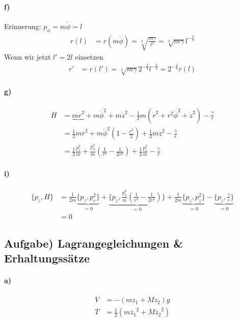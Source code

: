 \documentclass[oneside]{book}
\theoremstyle{definition}
\begin{document}
\paragraph{f)}
Erinnerung: $p_\phi = m \dot{\phi} = l$
\begin{align*}
	r(l) &= r(m \dot\phi) = \sqrt[3]{\frac{m \gamma}{l^2}} = \sqrt[3]{m \gamma} l^{-\frac23}
\end{align*}
Wenn wir jetzt $l' = 2 l$ einsetzen
\begin{align*}
	r' &= r(l') = \sqrt[3]{m \gamma} 2^{-\frac23}l^{-\frac23} = 2^{-\frac23} r(l)
\end{align*}

\paragraph{g)}
\begin{align*}
	H &= \underbrace{m \dot{r}^2} + m \dot{\phi}^2 + m \dot{z}^2 - \frac12 m (\dot{r}^2 + r^2 \dot{\phi}^2 + \dot{z}^2) - \frac{\gamma}{r}\\
	&= \frac12 m \dot{r}^2 + m \dot{\phi}^2 (1 - \frac{r^2}{2}) + \frac12 m \dot{z}^2 - \frac{\gamma}{r}\\
	&= \frac12 \frac{p_r^2}{m} + \frac{p_\phi^2}{m} (\frac{1}{r^4} - \frac{1}{2 r^2}) + \frac12 \frac{p_z^2}{m} - \frac{\gamma}{r}
\end{align*}

\paragraph{i)}
\begin{align*}
	\{p_z, H\} &= \frac1{2m} \underbrace{\{p_z, p_r^2\}}_{=0} + \underbrace{\{p_z, \frac{p_\phi^2}{m} (\frac{1}{r^4} - \frac{1}{2 r^2})\}}_{=0} + \frac1{2m} \underbrace{\{p_z, p_z^2\}}_{=0} - \underbrace{\{p_z, \frac{\gamma}{r}\}}_{=0}\\
	&= 0
\end{align*}


\subsection{Aufgabe) Lagrangegleichungen \& Erhaltungssätze}
\paragraph{a)}
\begin{align*}
	V &= - (mz_1 + Mz_2) g\\
	T &= \frac12 (m \dot{z_1}^2 + M \dot{z_2}^2) 
\end{align*}
\end{document}
